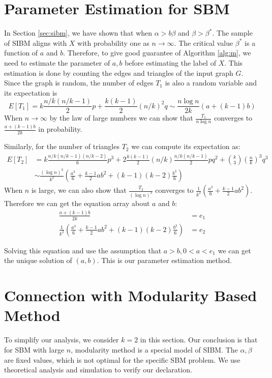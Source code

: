 \documentclass{ctexart}
\begin{document}
	\section{Parameter Estimation for SBM}
	In Section \ref{sec:sibm}, we have shown that when $\alpha > b \beta$ and $\beta > \beta^*$. The sample of SIBM aligns with $X$ with probability one
	as $n\to \infty$. 
	The critical value $\beta^*$ is a function of $a$ and $b$. Therefore, to give good guarantee of Algorithm \ref{alg:m}, we need to estimate the parameter
	of $a,b$ before estimating the label of $X$.
	This estimation is done by counting the edges and triangles of the input graph $G$.
	Since the graph is random, the number of edges $T_1$ is also a random variable and its expectation is
	\begin{equation}
	E[T_1] = k \frac{n/k(n/k-1)}{2} p + \frac{k(k-1)}{2} (n/k)^2 q \sim \frac{n\log n}{2k} (a + (k-1) b)
	\end{equation}
	When $n \to \infty$ by the law of large numbers we can show that $\frac{T_1}{n \log n}$ converges to $\frac{a+(k-1)b}{2k}$ in probability.
	
	Similarly, for the number of triangles $T_2$ we can compute its expectation as:
	\begin{align}
	E[T_2] &= k \frac{n/k(n/k-1)(n/k-2)}{6}p^3 + 2\frac{k(k-1)}{2}(n/k) \frac{n/k(n/k-1)}{2} pq^2 + \binom{k}{3} \left(\frac{n}{k}\right)^3 q^3 \\
	&\sim \frac{(\log n)^3}{k^2}
	(\frac{a^3}{6} + \frac{k-1}{2}ab^2 + (k-1)(k-2)\frac{b^3}{6})
	\end{align}
	When $n$ is large, we can also show that $\frac{T_2}{(\log n)^3}$ converges to $\frac{1}{k^2}
	(\frac{a^3}{6} + \frac{k-1}{2}ab^2)$. Therefore we can get the equation array about $a$ and $b$:
	\begin{align}
	\frac{a+(k-1)b}{2k} & = e_1 \label{eq:e_1}\\
	\frac{1}{k^2}
	\left(\frac{a^3}{6} + \frac{k-1}{2}ab^2 + (k-1)(k-2)\frac{b^3}{6}\right) & = e_2 \label{eq:e_2}
	\end{align}	
	
	Solving this equation and use the assumption that $ a > b, 0 < a < e_1$ we can get the unique solution of $(a,b)$.
	This is our parameter estimation method.
	\section{Connection with Modularity Based Method}
	To simplify our analysis, we consider $k=2$ in this section. Our conclusion is that for SBM with large $n$, modularity method
	is a special model of SIBM. The $\alpha, \beta$ are fixed values, which is not optimal for the specific SBM problem. We use theoretical
	analysis and simulation to verify our declaration.
\end{document}
